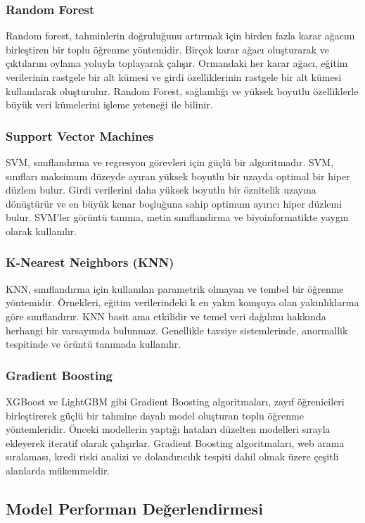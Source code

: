 \documentclass{article}
\begin{document}
\subsubsection{ Random Forest}
Random forest, tahminlerin doğruluğunu artırmak için birden fazla karar ağacını birleştiren bir toplu öğrenme yöntemidir. Birçok karar ağacı oluşturarak ve çıktılarını oylama yoluyla toplayarak çalışır. Ormandaki her karar ağacı, eğitim verilerinin rastgele bir alt kümesi ve girdi özelliklerinin rastgele bir alt kümesi kullanılarak oluşturulur. Random Forest, sağlamlığı ve yüksek boyutlu özelliklerle büyük veri kümelerini işleme yeteneği ile bilinir.
\subsubsection{ Support Vector Machines}
SVM, sınıflandırma ve regresyon görevleri için güçlü bir algoritmadır. SVM, sınıfları maksimum düzeyde ayıran yüksek boyutlu bir uzayda optimal bir hiper düzlem bulur. Girdi verilerini daha yüksek boyutlu bir öznitelik uzayına dönüştürür ve en büyük kenar boşluğuna sahip optimum ayırıcı hiper düzlemi bulur. SVM'ler görüntü tanıma, metin sınıflandırma ve biyoinformatikte yaygın olarak kullanılır.
\subsubsection{K-Nearest Neighbors (KNN)}
KNN, sınıflandırma için kullanılan parametrik olmayan ve tembel bir öğrenme yöntemidir. Örnekleri, eğitim verilerindeki k en yakın komşuya olan yakınlıklarına göre sınıflandırır. KNN basit ama etkilidir ve temel veri dağılımı hakkında herhangi bir varsayımda bulunmaz. Genellikle tavsiye sistemlerinde, anormallik tespitinde ve örüntü tanımada kullanılır.
\subsubsection{Gradient Boosting }
XGBoost ve LightGBM gibi Gradient Boosting algoritmaları, zayıf öğrenicileri birleştirerek güçlü bir tahmine dayalı model oluşturan toplu öğrenme yöntemleridir. Önceki modellerin yaptığı hataları düzelten modelleri sırayla ekleyerek iteratif olarak çalışırlar. Gradient Boosting algoritmaları, web arama sıralaması, kredi riski analizi ve dolandırıcılık tespiti dahil olmak üzere çeşitli alanlarda mükemmeldir.

\subsection{Model Performan Değerlendirmesi}
\end{document}
